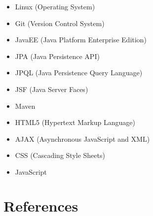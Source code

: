 \documentclass[a4paper]{article}
\begin{document}
\begin{itemize}
\item Linux (Operating System)
\item Git (Version Control System)
\item JavaEE (Java Platform Enterprise Edition)
\item JPA (Java Persistence API)
\item JPQL (Java Persistence Query Language)
\item JSF (Java Server Faces)
\item Maven
\item HTML5 (Hypertext Markup Language)
\item AJAX (Asynchronous JavaScript and XML)
\item CSS (Cascading Style Sheets)
\item JavaScript
\end{itemize}

\section{References}
\end{document}
